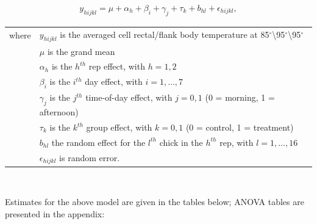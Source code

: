 \documentclass[a4paper, 10pt, titlepage]{article}
\begin{document}
\begin{align}
	y_{hijkl} = \mu + \alpha_h  + \beta_i + \gamma_j + \tau_k + b_{hl} + \epsilon_{hijkl},
\end{align}
{\renewcommand{\arraystretch}{1.5}
\begin{tabular}{ll}
     where  & $y_{hijkl}$ is the averaged cell rectal/flank body temperature at 85$^{\circ}$\textbackslash95$^{\circ}$\textbackslash95$^{\circ}$\\
            & $\mu$ is the grand mean\\
            & $\alpha_h$ is the $h^{th}$ rep effect, with $h = 1, 2$\\
            & $\beta_i$ is the $i^{th}$ day effect, with $i = 1,\ldots,7$\\
            & $\gamma_j$ is the $j^{th}$ time-of-day effect, with $j = 0, 1$ (0 = morning, 1 = afternoon)\\
            & $\tau_k$ is the $k^{th}$ group effect, with $k = 0, 1$ (0 = control, 1 = treatment)\\
            & $b_{hl}$ the random effect for the $l^{th}$ chick in the $h^{th}$ rep, with $l = 1,\ldots,16$\\
            & $\epsilon_{hijkl}$ is random error.
\end{tabular}\\}

Estimates for the above model are given in the tables below; ANOVA tables are presented in the appendix:
\end{document}
